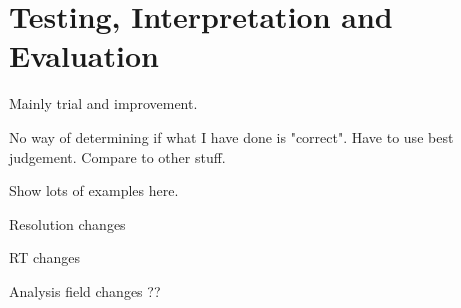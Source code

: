 \chapter{Testing, Interpretation and Evaluation}
\label{cha:tande}
 
Mainly trial and improvement.

No way of determining if what I have done is "correct". Have to use best judgement. Compare to other stuff.

Show lots of examples here.

Resolution changes

RT changes

Analysis field changes ??

